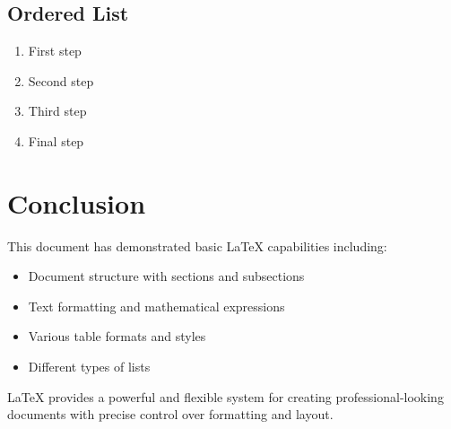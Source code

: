 \documentclass[12pt]{article}
\begin{document}
\subsection{Ordered List}
\begin{enumerate}
    \item First step
    \item Second step
    \item Third step
    \item Final step
\end{enumerate}

\section{Conclusion}

This document has demonstrated basic LaTeX capabilities including:
\begin{itemize}
    \item Document structure with sections and subsections
    \item Text formatting and mathematical expressions
    \item Various table formats and styles
    \item Different types of lists
\end{itemize}

LaTeX provides a powerful and flexible system for creating professional-looking documents with precise control over formatting and layout.
\end{document}
